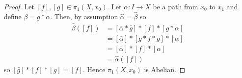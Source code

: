 \begin{proof}
Let $[f],[g]\in\pi_1(X,x_0)$. Let $\alpha\colon I\to X$ be a path from
$x_0$ to $x_1$ and define $\beta=g*\alpha$. Then, by assumption
$\hat\alpha=\hat\beta$ so
\begin{align*}
\hat\beta([f])&=[\bar \alpha*\bar g]*[f]*[g*\alpha]\\
              &=[\bar\alpha]*[\bar g*f*g]*[\alpha]\\
              &=[\bar\alpha]*[f]*[\alpha]\\
              &=\hat\alpha([f])
\end{align*}
so $[\bar g]*[f]*[g]=[f]$. Hence $\pi_1(X,x_0)$ is Abelian.
\end{proof}

